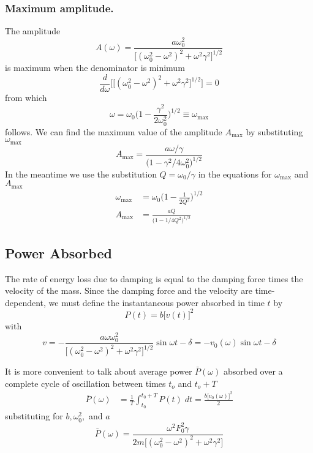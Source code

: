 \documentclass[../../../main.tex]{subfiles}
\begin{document}
\subsubsection{Maximum amplitude.} The amplitude
\begin{equation*}
    A(\omega)=\frac{a\omega_0^2 }{\big[(\omega_0^2- \omega^2)^2 +\omega^2\gamma^2\big]^{1/2} }
\end{equation*}
is maximum when the denominator is minimum
\begin{equation*}
    \frac{d}{d\omega}\biggl[\big[(\omega_0^2- \omega^2)^2 +\omega^2\gamma^2\big]^{1/2} \biggr]= 0
\end{equation*}
from which 
\begin{equation*}
    \omega=\omega_0\bigg(1-\frac{\gamma^2}{2\omega_0^2}\bigg)^{1/2}\equiv\omega_{\text{max}}
\end{equation*}
follows. We can find the maximum value of the amplitude $A_{\text{max}}$ by substituting $\omega_{\text{max}}$
\begin{equation*}
    A_{\text{max}}=\frac{a\omega/\gamma}{\big(1-\gamma^2/4\omega_0^2 \big)^{1/2}}
\end{equation*}
In the meantime we use the substitution $Q = \omega_0/\gamma$ in the equations for $\omega_{\text{max}}$ and $A_{\text{max}}$
\begin{align*}
    \omega_{\text{max}}&=\omega_0\bigg(1-\frac{1}{2Q^2}\bigg)^{1/2}\\
    A_{\text{max}}&=\frac{aQ}{\big(1-1/4Q^2 \big)^{1/2}}
\end{align*}

\subsection{Power Absorbed}
The rate of energy loss due to damping is equal to the damping force times the velocity of the mass. 
Since the damping force and the velocity are time-dependent, we must define the instantaneous power absorbed in time $t$ by
\begin{equation*}
    P(t)=b\big[v(t)\big]^2
\end{equation*}
with
\begin{equation*}
    v=-\frac{a\omega\omega_0^2}{\big[(\omega_0^2-\omega^2)^2+\omega^2\gamma^2\big]^{1/2}} \sin \omega t -\delta=-v_0(\omega) \sin \omega t -\delta
\end{equation*}

It is more convenient to talk about average power $ \bar{P} (\omega)$ absorbed over a complete cycle of oscillation between times $t_o$ and $t_o + T$
\begin{align*}
    \bar{P} (\omega)&=\frac{1}{T}\int_{t_0}^{t_0+T}P(t) \;dt=\frac{b\big[v_0(\omega)\big]^2}{2}
\end{align*}
substituting for $b, \omega_0^2,$ and $a$
\begin{equation*}
    \bar{P} (\omega)=\frac{\omega^2F_0^2\gamma}{2m\big[(\omega_0^2-\omega^2)^2+\omega^2 \gamma^2\big]}
\end{equation*}
\end{document}
